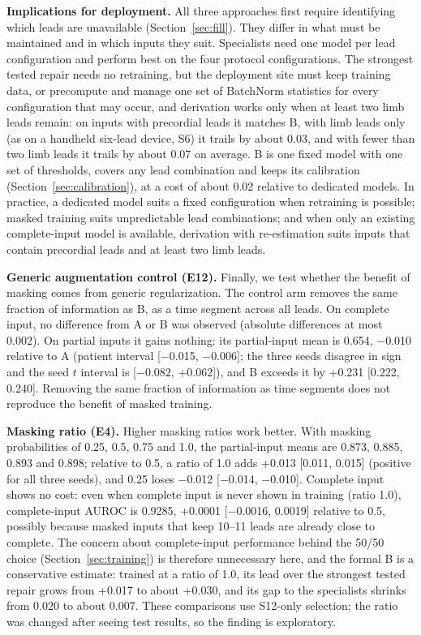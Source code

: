 \textbf{Implications for deployment.} All three approaches first require identifying which leads are unavailable (Section~\ref{sec:fill}). They differ in what must be maintained and in which inputs they suit. Specialists need one model per lead configuration and perform best on the four protocol configurations. The strongest tested repair needs no retraining, but the deployment site must keep training data, or precompute and manage one set of BatchNorm statistics for every configuration that may occur, and derivation works only when at least two limb leads remain: on inputs with precordial leads it matches B, with limb leads only (as on a handheld six-lead device, S6) it trails by about 0.03, and with fewer than two limb leads it trails by about 0.07 on average. B is one fixed model with one set of thresholds, covers any lead combination and keeps its calibration (Section~\ref{sec:calibration}), at a cost of about 0.02 relative to dedicated models. In practice, a dedicated model suits a fixed configuration when retraining is possible; masked training suits unpredictable lead combinations; and when only an existing complete-input model is available, derivation with re-estimation suits inputs that contain precordial leads and at least two limb leads.

\textbf{Generic augmentation control (E12).} Finally, we test whether the benefit of masking comes from generic regularization. The control arm removes the same fraction of information as B, as a time segment across all leads. On complete input, no difference from A or B was observed (absolute differences at most 0.002). On partial inputs it gains nothing: its partial-input mean is 0.654, $-$0.010 relative to A (patient interval [$-$0.015, $-$0.006]; the three seeds disagree in sign and the seed $t$ interval is [$-$0.082, +0.062]), and B exceeds it by +0.231 [0.222, 0.240]. Removing the same fraction of information as time segments does not reproduce the benefit of masked training.

\textbf{Masking ratio (E4).} Higher masking ratios work better. With masking probabilities of 0.25, 0.5, 0.75 and 1.0, the partial-input means are 0.873, 0.885, 0.893 and 0.898; relative to 0.5, a ratio of 1.0 adds +0.013 [0.011, 0.015] (positive for all three seeds), and 0.25 loses $-$0.012 [$-$0.014, $-$0.010]. Complete input shows no cost: even when complete input is never shown in training (ratio 1.0), complete-input AUROC is 0.9285, +0.0001 [$-$0.0016, 0.0019] relative to 0.5, possibly because masked inputs that keep 10--11 leads are already close to complete. The concern about complete-input performance behind the 50/50 choice (Section~\ref{sec:training}) is therefore unnecessary here, and the formal B is a conservative estimate: trained at a ratio of 1.0, its lead over the strongest tested repair grows from +0.017 to about +0.030, and its gap to the specialists shrinks from 0.020 to about 0.007. These comparisons use S12-only selection; the ratio was changed after seeing test results, so the finding is exploratory.


